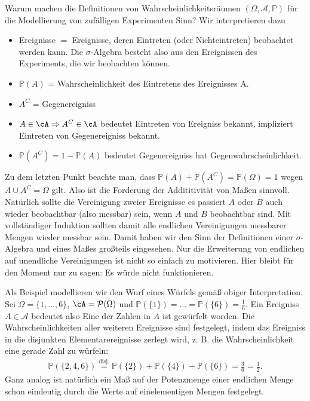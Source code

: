\begin{disc}\label{N1}
	Warum machen die Definitionen von Wahrscheinlichkeitsräumen $(\Omega, \mathcal A, \mathbb P)$ für die Modellierung von zufälligen Experimenten Sinn? Wir interpretieren dazu
	\begin{itemize}
		\item Ereignisse $=$ \glqq Ereignisse, deren Eintreten (oder Nichteintreten) beobachtet werden kann.\grqq{} Die $\sigma$-Algebra besteht also aus den Ereignissen des Experiments, die wir beobachten k\"onnen.
		\item $\mathbb P(A)$ = \glqq Wahrscheinlichkeit des Eintretens des Ereignisses A.\grqq
		\item $A^C$ = \glqq Gegenereigniss\grqq
		\item $A \in \cA \Rightarrow A^{C} \in \cA$ bedeutet \glqq Eintreten von Ereigniss bekannt, impliziert Eintreten von Gegenereigniss bekannt.\grqq
		\item $\mathbb P(A^C) = 1-\mathbb P(A)$ bedeutet \glqq Gegenereigniss hat Gegenwahrscheinlichkeit.\grqq 
	\end{itemize}
	Zu dem letzten Punkt beachte man, dass $\mathbb P(A)+\mathbb P(A^C)=\mathbb P(\Omega)=1$ wegen $A\cup A^C=\Omega$ gilt. Also ist die Forderung der Addititivit\"at von Ma\ss en sinnvoll. Nat\"urlich sollte die Vereinigung zweier Ereignisse \glqq es passiert $A$ oder $B$\grqq{} auch wieder beobachtbar (also messbar) sein, wenn $A$ und $B$ beobachtbar sind. Mit vollst\"andiger Induktion sollten damit alle endlichen Vereinigungen messbarer Mengen wieder messbar sein. Damit haben wir den Sinn der Definitionen einer $\sigma$-Algebra und eines Ma\ss es gro\ss teils eingesehen. Nur die Erweiterung von endlichen auf unendliche Vereinigungen ist nicht so einfach zu motivieren. Hier bleibt f\"ur den Moment nur zu sagen: Es w\"urde nicht funktionieren.\smallskip

	Als Beispiel modellieren wir den Wurf eines W\"urfels gem\"a\ss{} obiger Interpretation. Sei $\Omega = \{1,...,6\}$, $\cA=\mathcal P(\Omega)$ und $\mathbb P(\{1\})=...=\mathbb P(\{6\})= \frac{1}{6}$. Ein Ereigniss $A\in \mathcal A$ bedeutet also \glqq Eine der Zahlen in $A$ ist gew\"urfelt worden\grqq. Die Wahrscheinlichkeiten aller weiteren Ereignisse sind festgelegt, indem das Ereigniss in die disjunkten Elementarereignisse zerlegt wird, z. B. die Wahrscheinlichkeit eine gerade Zahl zu w\"urfeln:
	\begin{align*}	
		\mathbb P(\{2, 4,6\}) \overset{\text{disj.}}{=} \mathbb P(\{2\})+\mathbb P(\{4\})+\mathbb P(\{6\}) =\frac{3}{6}= \frac{1}{2}.
	\end{align*}
	Ganz analog ist nat\"urlich ein Ma\ss{} auf der Potenzmenge einer endlichen Menge schon eindeutig durch die Werte auf einelementigen Mengen festgelegt.
\end{disc}


